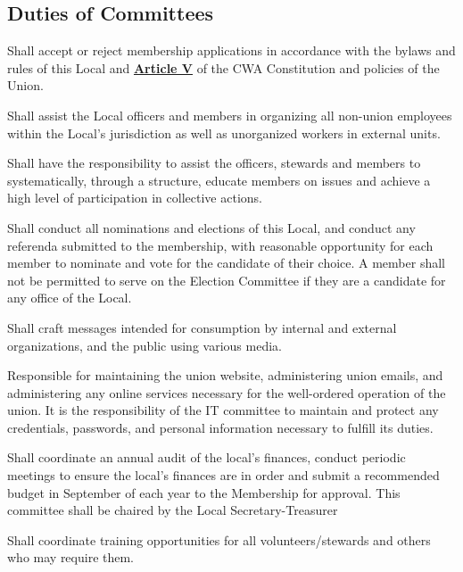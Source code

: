\documentclass[11pt]{article}
\let\oldhref\href
\renewcommand{\href}[2]{\oldhref{#1}{\bfseries#2}}
\newcommand{\articlesection}[1]{\vspace{.25cm}\subsection{#1}}
\begin{document}
\articlesection{Duties of Committees}\label{duties-of-committees}
\begin{description}[labelwidth=\linewidth, listparindent=0pt]
\item[Membership Committee]
Shall accept or reject membership applications in accordance with the bylaws and rules of this Local and \href{https://cwa-union.org/for-locals/cwa-constitution\#A5}{Article V} of the CWA Constitution and policies of the Union.

\item[Organizing Committee]
Shall assist the Local officers and members in organizing all non-union employees within the Local's jurisdiction as well as unorganized workers in external units.

\item[Mobilization Committee]
Shall have the responsibility to assist the officers, stewards and members to systematically, through a structure, educate members on issues and achieve a high level of participation in collective actions.

\item[Election Committee]
Shall conduct all nominations and elections of this Local, and conduct any referenda submitted to the membership,  with reasonable opportunity for each member to nominate and vote for the candidate of their choice. A member shall not be permitted to serve on the Election Committee if they are a candidate for any office of the Local.

\item[Communications Committee]
Shall craft messages intended for consumption by internal and external organizations, and the public using various media.

\item[IT Committee]
Responsible for maintaining the union website, administering union emails, and administering any online services necessary for the well-ordered operation of the union. It is the responsibility of the IT committee to maintain and protect any credentials, passwords, and personal information necessary to fulfill its duties.

\item[Finance Committee]
Shall coordinate an annual audit of the local’s finances, conduct periodic meetings to ensure the local’s finances are in order and submit a recommended budget in September of each year to the Membership for approval. This committee shall be chaired by the Local Secretary-Treasurer

\item[Education Committee]
Shall coordinate training opportunities for all volunteers/stewards and others who may require them.


\end{description}
\end{document}
